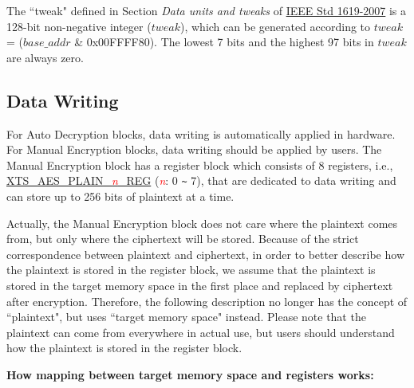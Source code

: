 \documentclass[main\_\_EN.tex]{subfiles}
\begin{document}
\begin{tiplisting}
\vspace{-2em}
\begin{enumerate}
    The ``tweak" defined in Section \textit{Data units and tweaks} of \href{https://ieeexplore.ieee.org/document/4493450}{IEEE Std 1619-2007} is a 128-bit non-negative integer (\begin{math} tweak \end{math}), which can be generated according to \begin{math} tweak \end{math} = (\begin{math} base\_addr \end{math} \& 0x00FFFF80). The lowest 7 bits and the highest 97 bits in \begin{math} tweak \end{math} are always zero.
\end{enumerate}
\end{tiplisting}

\subsection{Data Writing}
\label{sec:extmemncr-data-writing}

For Auto Decryption blocks, data writing is automatically applied in hardware. For Manual Encryption blocks, data writing should be applied by users. The Manual Encryption block has a register block which consists of 8 registers, i.e., \hyperref[regdesc:XTSAESPLAINNREG]{XTS\_AES\_PLAIN\_\textcolor{red}{\it{n}}\_REG} (\textcolor{red}{\it{n}}: 0 \verb+~+ 7), that are dedicated to data writing and can store up to 256 bits of plaintext at a time.

Actually, the Manual Encryption block does not care where the plaintext comes from, but only where the ciphertext will be stored. Because of the strict correspondence between plaintext and ciphertext, in order to better describe how the plaintext is stored in the register block, we assume that the plaintext is stored in the target memory space in the first place and replaced by ciphertext after encryption. Therefore, the following description no longer has the concept of ``plaintext", but uses ``target memory space" instead. Please note that the plaintext can come from everywhere in actual use, but users should understand how the plaintext is stored in the register block.

{\bfseries How mapping between target memory space and registers works:}
\end{document}
